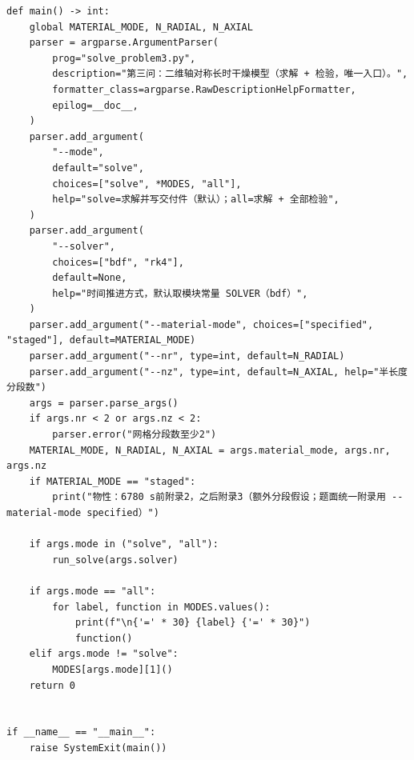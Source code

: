 \documentclass[12pt,a4paper]{ctexart}
\begin{document}
\begin{lstlisting}[caption={solve\_problem3.py }]
def main() -> int:
    global MATERIAL_MODE, N_RADIAL, N_AXIAL
    parser = argparse.ArgumentParser(
        prog="solve_problem3.py",
        description="第三问：二维轴对称长时干燥模型（求解 + 检验，唯一入口）。",
        formatter_class=argparse.RawDescriptionHelpFormatter,
        epilog=__doc__,
    )
    parser.add_argument(
        "--mode",
        default="solve",
        choices=["solve", *MODES, "all"],
        help="solve=求解并写交付件（默认）；all=求解 + 全部检验",
    )
    parser.add_argument(
        "--solver",
        choices=["bdf", "rk4"],
        default=None,
        help="时间推进方式，默认取模块常量 SOLVER（bdf）",
    )
    parser.add_argument("--material-mode", choices=["specified", "staged"], default=MATERIAL_MODE)
    parser.add_argument("--nr", type=int, default=N_RADIAL)
    parser.add_argument("--nz", type=int, default=N_AXIAL, help="半长度分段数")
    args = parser.parse_args()
    if args.nr < 2 or args.nz < 2:
        parser.error("网格分段数至少2")
    MATERIAL_MODE, N_RADIAL, N_AXIAL = args.material_mode, args.nr, args.nz
    if MATERIAL_MODE == "staged":
        print("物性：6780 s前附录2，之后附录3（额外分段假设；题面统一附录用 --material-mode specified）")

    if args.mode in ("solve", "all"):
        run_solve(args.solver)

    if args.mode == "all":
        for label, function in MODES.values():
            print(f"\n{'=' * 30} {label} {'=' * 30}")
            function()
    elif args.mode != "solve":
        MODES[args.mode][1]()
    return 0


if __name__ == "__main__":
    raise SystemExit(main())
\end{lstlisting}
\end{document}
